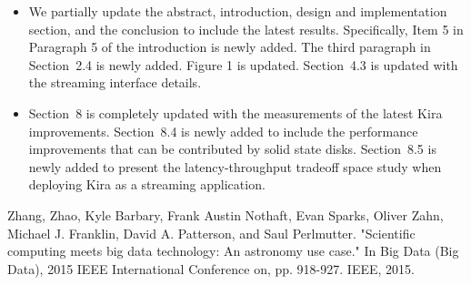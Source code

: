 \documentclass[10pt,a4paper]{article}
\begin{document}
\begin{itemize}
\item{} We partially update the abstract, introduction, design and implementation section, and the conclusion to include the latest results.
Specifically, Item 5 in Paragraph 5 of the introduction is newly added.
The third paragraph in Section~2.4 is newly added.
Figure 1 is updated.
Section~4.3 is updated with the streaming interface details.

\item{} Section~8 is completely updated with the measurements of the latest Kira improvements.
Section~8.4 is newly added to include the performance improvements that can be contributed by solid state disks.
Section~8.5 is newly added to present the latency-throughput tradeoff space study when deploying Kira as a streaming application.
\end{itemize}


\begin{thebibliography}{1}

Zhang, Zhao, Kyle Barbary, Frank Austin Nothaft, Evan Sparks, Oliver Zahn, Michael J. Franklin, David A. Patterson, and Saul Perlmutter. "Scientific computing meets big data technology: An astronomy use case." In Big Data (Big Data), 2015 IEEE International Conference on, pp. 918-927. IEEE, 2015.
\end{thebibliography}
\end{document}
